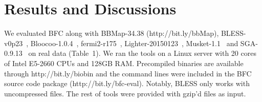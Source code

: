 \documentclass{bioinfo}
\begin{document}
\section{Results and Discussions}

We evaluated BFC along with BBMap-34.38 (\mbox{http://bit.ly/bbMap}),
BLESS-v0p23~\citep{Heo:2014aa}, Bloocoo-1.0.4~\citep{Drezen:2014aa},
fermi2-r175~\citep{Li:2012fk}, Lighter-20150123~\citep{Song:2014aa},
Musket-1.1~\citep{Liu:2013ac} and SGA-0.9.13~\citep{Simpson:2012aa} on real
data (Table~1). We ran the tools on a Linux server with 20 cores of Intel
E5-2660 CPUs and 128GB RAM. Precompiled binaries are available through
http://bit.ly/biobin and the command lines were included in the BFC source code
package (http://bit.ly/bfc-eval).  Notably, BLESS only works with uncompressed
files. The rest of tools were provided with gzip'd files as input.
\end{document}

